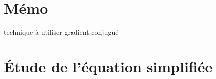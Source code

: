 \documentclass[a4paper,10pt]{article}
\title{}
\author{Arnaud Paran}
\begin{document}
  \maketitle

  \begin{abstract}

  \end{abstract}

  \section{Mémo}
  technique à utiliser gradient conjugué

  \section{Étude de l'équation simplifiée}
      
\end{document}
